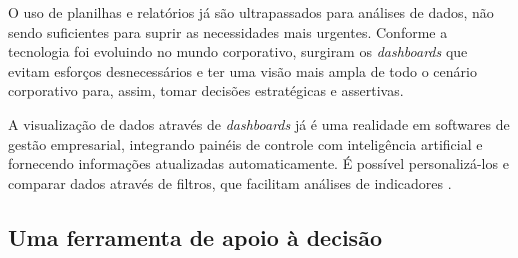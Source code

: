 \par O uso de planilhas e relatórios já são ultrapassados para análises de dados, não sendo suficientes para suprir as necessidades mais urgentes. Conforme a tecnologia foi evoluindo no mundo corporativo, surgiram os \textit{dashboards} que evitam esforços desnecessários e ter uma visão mais ampla de todo o cenário corporativo para, assim, tomar decisões estratégicas e assertivas.

\par A visualização de dados através de \textit{dashboards} já é uma realidade em softwares de gestão empresarial, integrando painéis de controle com inteligência artificial e fornecendo informações atualizadas automaticamente. É possível personalizá-los e comparar dados através de filtros, que facilitam análises de indicadores \cite{Tecnicon}.


\subsection{Uma ferramenta de apoio à decisão}

